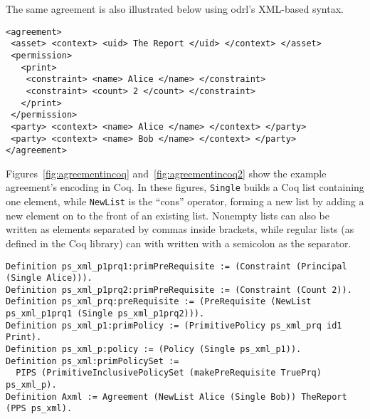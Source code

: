 \documentclass[conference]{IEEEtran}
\newcommand{\syn}{\texttt}
\begin{document}
The same agreement is also illustrated below using \ac{odrl}'s XML-based syntax.  

\lstset{language=Pucella2006, captionpos=b}
\begin{lstlisting}
<agreement>
 <asset> <context> <uid> The Report </uid> </context> </asset>
 <permission>
   <print>
    <constraint> <name> Alice </name> </constraint>
    <constraint> <count> 2 </count> </constraint>
   </print>
 </permission>
 <party> <context> <name> Alice </name> </context> </party>
 <party> <context> <name> Bob </name> </context> </party>
</agreement>
\end{lstlisting}




Figures~\ref{fig:agreementincoq} and~\ref{fig:agreementincoq2}
show the example agreement's encoding in Coq. In these figures, \syn{Single} builds a Coq
list containing one element, while \syn{NewList} is the ``cons''
operator, forming a new list by adding a new element on to the front
of an existing list.  Nonempty lists can also be written as elements
separated by commas inside brackets, while regular lists (as defined in
the Coq library) can with written with a semicolon as the separator.

\lstset{language=Coq, captionpos=b}
\begin{figure*}
\begin{lstlisting}
Definition ps_xml_p1prq1:primPreRequisite := (Constraint (Principal (Single Alice))).
Definition ps_xml_p1prq2:primPreRequisite := (Constraint (Count 2)).
Definition ps_xml_prq:preRequisite := (PreRequisite (NewList ps_xml_p1prq1 (Single ps_xml_p1prq2))).
Definition ps_xml_p1:primPolicy := (PrimitivePolicy ps_xml_prq id1 Print).
Definition ps_xml_p:policy := (Policy (Single ps_xml_p1)).
Definition ps_xml:primPolicySet :=
  PIPS (PrimitiveInclusivePolicySet (makePreRequisite TruePrq) ps_xml_p).
Definition Axml := Agreement (NewList Alice (Single Bob)) TheReport (PPS ps_xml).
\end{lstlisting}
\caption{Coq Definitions for Example Agreement}
\label{fig:agreementincoq}
\end{figure*}
\end{document}
